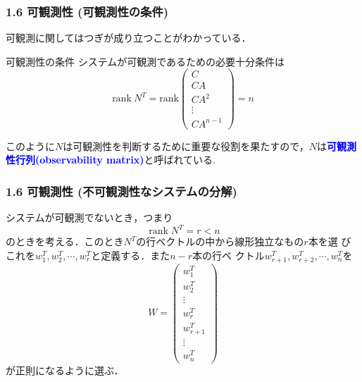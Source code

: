 \documentclass[10pt]{beamer}
\begin{document}
\begin{frame}[t]
\frametitle{1.6 可観測性 (可観測性の条件)}
可観測に関してはつぎが成り立つことがわかっている．
\begin{block}{可観測性の条件}
システムが可観測であるための必要十分条件は
  $$\mbox{rank}\ N^T
  = \mbox{rank}
    \left(\begin{array}{c}
           C        \\
     C A      \\
     C A^2    \\
     \vdots   \\
     C A^{n-1}
    \end{array}\right)
  = n$$
\end{block}
このように$N$は可観測性を判断するために重要な役割を果たすので，$N$は\textcolor{blue}{\bf 可観測性行列(observability matrix)}と呼ばれている.
\end{frame}


\begin{frame}[t]
\frametitle{1.6 可観測性 (不可観測性なシステムの分解)}
システムが可観測でないとき，つまり
\begin{equation}
 \operatorname{rank} N^T = r < n
\end{equation}
のときを考える．このとき$N^T$の行ベクトルの中から線形独立なもの$r$本を選
びこれを$w_1^T, w_2^T, \cdots, w_r^T$と定義する．また$n-r$本の行ベ
クトル$w_{r+1}^T, w_{r+2}^T, \cdots, w_n^T$を
\begin{equation}
 W = \left(\begin{array}{c}
            w_1^T \\
      w_2^T \\
      \vdots \\
      w_r^T \\
      w_{r+1}^T \\
      \vdots \\
      w_n^T
     \end{array}\right)
\end{equation}
が正則になるように選ぶ．
\end{frame}
\end{document}
